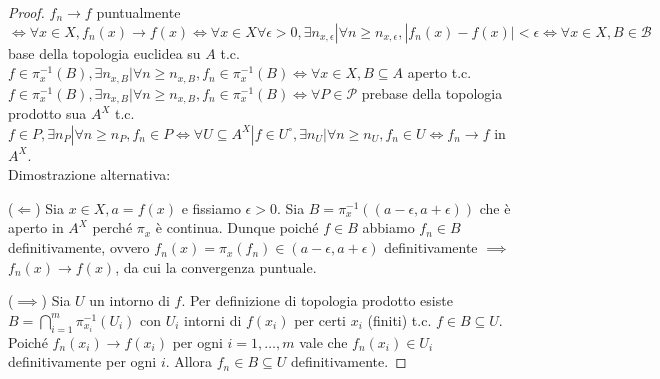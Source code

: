 \begin{proof}
  $f_n \rightarrow f$ puntualmente $\Leftrightarrow \forall x \in X, f_n(x) \rightarrow f(x) \Leftrightarrow \forall x \in X \forall \epsilon>0, \exists n_{x, \epsilon} | \forall n \ge n_{x, \epsilon}, |f_n(x)-f(x)|<\epsilon \Leftrightarrow \forall x \in X, B \in \mathcal{B}$
  base della topologia euclidea su $A$ t.c. $f \in \pi_x^{-1}(B), \exists n_{x, B} | \forall n \ge n_{x, B}, f_n \in \pi_x^{-1}(B) \Leftrightarrow \forall x \in X, B \subseteq A$ aperto t.c.
  $f \in \pi_x^{-1}(B), \exists n_{x, B} | \forall n \ge n_{x, B}, f_n \in \pi_x^{-1}(B) \Leftrightarrow \forall P \in \mathcal{P}$ prebase della topologia prodotto sua $A^X$ t.c.
  $f \in P, \exists n_P | \forall n \ge n_P, f_n \in P \Leftrightarrow \forall U \subseteq A^X | f \in U^{\circ}, \exists n_U | \forall n \ge n_U, f_n \in U \Leftrightarrow f_n \rightarrow f$ in $A^X$. \\

  Dimostrazione alternativa:

  ($\Leftarrow$) Sia $x \in X, a=f(x)$ e fissiamo $\epsilon>0$. Sia $B=\pi_x^{-1}((a-\epsilon,a+\epsilon))$ che è aperto in $A^X$ perché $\pi_x$ è continua. Dunque poiché $f \in B$ abbiamo $f_n \in B$ definitivamente, ovvero $f_n(x)=\pi_x(f_n) \in (a-\epsilon,a+\epsilon)$ definitivamente $\implies$ $f_n(x) \longrightarrow f(x)$, da cui la convergenza puntuale.

  ($\implies$) Sia $U$ un intorno di $f$. Per definizione di topologia prodotto esiste $\displaystyle B=\bigcap_{i=1}^m \pi_{x_i}^{-1}(U_i)$ con $U_i$ intorni di $f(x_i)$ per certi $x_i$ (finiti) t.c. $f \in B \subseteq U$. Poiché $f_n(x_i) \longrightarrow f(x_i)$ per ogni $i=1,\dots,m$ vale che $f_n(x_i) \in U_i$ definitivamente per ogni $i$. Allora $f_n \in B \subseteq U$ definitivamente.
\end{proof}
